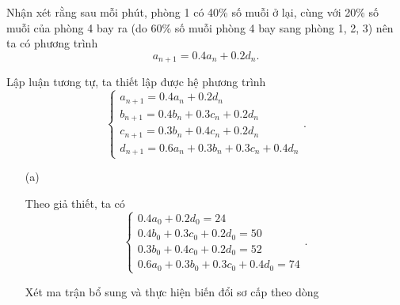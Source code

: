 Nhận xét rằng sau mỗi phút, phòng 1 có 40\% số muỗi ở lại, cùng với 20\% số muỗi của phòng 4 bay ra (do 60\% số muỗi phòng 4 bay sang phòng 1, 2, 3) nên ta có phương trình $$a_{n+1} = 0.4a_n + 0.2d_n.$$

Lập luận tương tự, ta thiết lập được hệ phương trình $$\begin{cases}
    a_{n+1} = 0.4a_n + 0.2d_n \\
    b_{n+1} = 0.4b_n + 0.3c_n + 0.2d_n \\
    c_{n+1} = 0.3b_n + 0.4c_n + 0.2d_n \\
    d_{n+1} = 0.6a_n + 0.3b_n + 0.3c_n + 0.4d_n 
\end{cases}.$$

\begin{enumerate}
    \item[(a)] {
        Theo giả thiết, ta có 
        $$\begin{cases}
            0.4a_0 + 0.2d_0 = 24 \\
            0.4b_0 + 0.3c_0 + 0.2d_0 = 50 \\
            0.3b_0 + 0.4c_0 + 0.2d_0 = 52 \\
            0.6a_0 + 0.3b_0 + 0.3c_0 + 0.4d_0 = 74
        \end{cases}.$$

        Xét ma trận bổ sung và thực hiện biến đổi sơ cấp theo dòng 

}
\end{enumerate}
